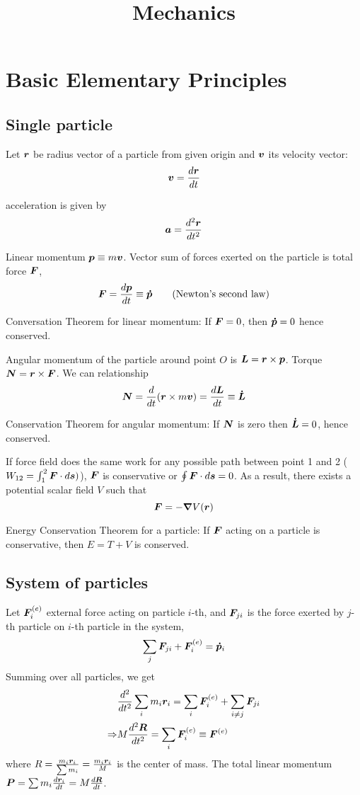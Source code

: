 \documentclass[12pt]{article}
\title{Mechanics}
\begin{document}
	\maketitle
	
\section{Basic Elementary Principles}
\subsection{Single particle}
Let $\boldsymbol{r}$ be radius vector of a particle from given origin and $\boldsymbol{v}$ its velocity vector:
$$ \boldsymbol{v} = \frac{d \boldsymbol{r}}{dt}$$

acceleration is given by $$ \boldsymbol{a} = \frac{d^2 \boldsymbol{r}}{d t^2}$$

Linear momentum $\boldsymbol{p} \equiv m \boldsymbol{v}$. Vector sum of forces exerted on the particle is total force $\boldsymbol{F}$,  
$$\boldsymbol{F} = \frac{d\boldsymbol{p}}{dt} \equiv  \boldsymbol{\dot p} \quad \quad \text{(Newton's second law)}$$

Conversation Theorem for linear momentum: If $\boldsymbol{F} = 0$, then $\boldsymbol{\dot p} = 0$ hence conserved.

Angular momentum of the particle around point $O$ is $\boldsymbol{L} = \boldsymbol{r} \times \boldsymbol{p}$. Torque $\boldsymbol{N} = \boldsymbol{r} \times \boldsymbol{F}$.
We can relationship $$ \boldsymbol{N} = \frac{d}{dt} (\boldsymbol{r} \times m\boldsymbol{v}) = \frac{d \boldsymbol{L}}{dt} \equiv \boldsymbol{\dot L}$$

Conservation Theorem for angular momentum: If $\boldsymbol{N}$ is zero then $\boldsymbol{\dot L} = 0$, hence conserved.

If force field does the same work for any possible path between point 1 and 2 ($W_{12} = \int^2_1 \boldsymbol{F}\cdot d \boldsymbol{s})$), 
$\boldsymbol{F}$ is conservative or $\oint \boldsymbol{F} \cdot d \boldsymbol{s} = 0$. As a result, 
there exists a potential scalar field $V$ such that $$\boldsymbol{F} = -\grad{V(\boldsymbol{r})}$$

Energy Conservation Theorem for a particle: If $\boldsymbol{F}$ acting on a particle is conservative, then $E = T + V$ is conserved.

\subsection{System of particles}
Let $\boldsymbol{F}^{(e)}_i$ external force acting on particle $i$-th, and $\boldsymbol{F}_{ji}$ is the force 
exerted by $j$-th particle on $i$-th particle in the system, 
$$\sum_j \boldsymbol{F}_{ji} +  \boldsymbol{F}^{(e)}_i = \boldsymbol{\dot{p}}_i$$
Summing over all particles, we get  \begin{align}
	& \frac{d^2}{dt^2} \sum_i m_i \boldsymbol{r}_i = \sum_i \boldsymbol{F}^{(e)}_i + \sum_{i \neq j} \boldsymbol{F}_{ji} \\
	\Rightarrow & M \frac{d^2 \boldsymbol{R}}{dt^2} = \sum_i \boldsymbol{F}^{(e)}_i \equiv \boldsymbol{F}^{(e)}
\end{align}
where $R = \frac{m_i \boldsymbol{r}_i}{\sum m_i} =  \frac{m_i \boldsymbol{r}_i}{M}$ is the center of mass.
The total linear momentum $\boldsymbol{P} = \sum m_i \frac{d\boldsymbol{r}_i}{dt} = M \frac{d\boldsymbol{R}}{dt}$.
\end{document}
